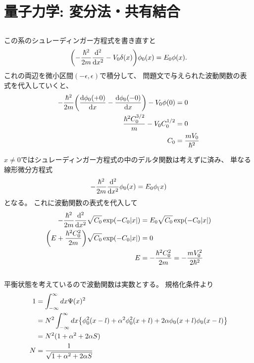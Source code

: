 \documentclass[../ap_2008.tex]{subfiles}
\begin{document}
\chapter{量子力学: 変分法・共有結合}
\section{}
この系のシュレーディンガー方程式を書き直すと
\begin{equation}\begin{aligned}[b]
    \qty(-\frac{\hbar^2}{2m}\dv[2]{x}-V_0\delta(x))\phi_0(x)=E_0\phi(x).
\end{aligned}\end{equation}
これの両辺を微小区間\((-\epsilon,\epsilon)\)で積分して、
問題文で与えられた波動関数の表式を代入していくと、
\begin{equation}\begin{aligned}[b]
    -\frac{\hbar^2}{2m}\qty(\dv{\phi_0(+0)}{x}-\dv{\phi_0(-0)}{x})-V_0\phi(0)&=0\\
    \frac{\hbar^2C_0^{3/2}}{m}-V_0C_0^{1/2}&=0\\
    C_0 &= \frac{mV_0}{\hbar^2}
\end{aligned}\end{equation}

\(x\neq0\)ではシュレーディンガー方程式の中のデルタ関数は考えずに済み、
単なる線形微分方程式
\begin{equation}\begin{aligned}[b]
    -\frac{\hbar^2}{2m}\dv[2]{x}\phi_0(x)=E_0\phi_(x)
\end{aligned}\end{equation}
となる。
これに波動関数の表式を代入して
\begin{equation}\begin{aligned}[b]
    -\frac{\hbar^2}{2m}\dv[2]{x}\sqrt{C_0}\exp(-C_0\abs{x})&=E_0\sqrt{C_0}\exp(-C_0\abs{x})\\
    \qty(E+\frac{\hbar^2C_0^2}{2m})\sqrt{C_0}\exp(-C_0\abs{x}) &=0\\
    E &= -\frac{\hbar^2C_0^2}{2m}=-\frac{mV_0^2}{2\hbar^2}
\end{aligned}\end{equation}

\section{}
平衡状態を考えているので波動関数は実数とする。
規格化条件より
\begin{equation}\begin{aligned}[b]
    1 &= \int_{-\infty}^\infty dx\Psi(x)^2\\
    &=N^2\int_{-\infty}^{\infty}dx\qty{\phi_0^2(x-l)+\alpha^2\phi_0^2(x+l)+2\alpha\phi_0(x+l)\phi_0(x-l)}\\
    &=N^2(1+\alpha^2+2\alpha S)\\
    N &= \frac{1}{\sqrt{1+\alpha^2+2\alpha S}}
\end{aligned}\end{equation}
\end{document}
